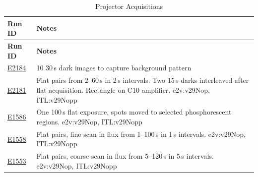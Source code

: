 \begin{longtable}{|p{5.0cm}|p{8.5cm}|}
\caption{Projector Acquisitions}\label{table:runs_projector} \\
\hline
\textbf{Run ID} & \textbf{Notes} \\ \hline
\endfirsthead
\hline
\textbf{Run ID} & \textbf{Notes} \\ \hline
\endhead
\hline
\endfoot
\hline
\endlastfoot

\href{https://s3df.slac.stanford.edu/data/rubin/lsstcam/E2184/w_2024_35/}{E2184} & 10 30\,s dark images to capture background pattern \\ \hline
\href{https://s3df.slac.stanford.edu/data/rubin/lsstcam/E2181/w_2024_35/}{E2181} & Flat pairs from 2--60\,s in 2\,s intervals. Two 15\,s darks interleaved after flat acquisition. Rectangle on C10 amplifier. e2v:v29Nop, ITL:v29Nopp \\ \hline
\href{https://s3df.slac.stanford.edu/data/rubin/lsstcam/E1586/w_2024_35/}{E1586} & One 100\,s flat exposure, spots moved to selected phosphorescent regions. e2v:v29Nop, ITL:v29Nopp \\ \hline
\href{https://s3df.slac.stanford.edu/data/rubin/lsstcam/E1558/w_2024_35/}{E1558} & Flat pairs, fine scan in flux from 1--100\,s in 1\,s intervals. e2v:v29Nop, ITL:v29Nopp \\ \hline
\href{https://s3df.slac.stanford.edu/data/rubin/lsstcam/E1553/w_2024_35/}{E1553} & Flat pairs, coarse scan in flux from 5--120\,s in 5\,s intervals. e2v:v29Nop, ITL:v29Nopp \\ \hline

\end{longtable}

